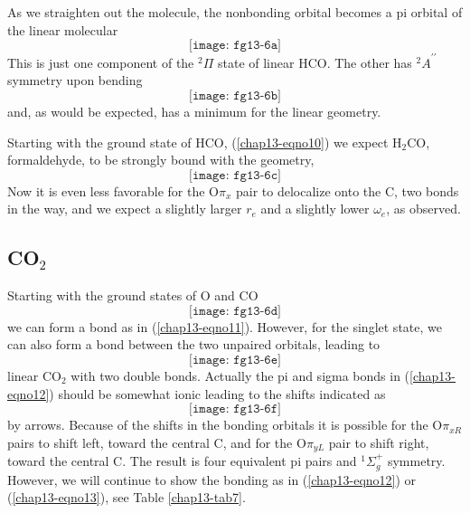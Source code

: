 As we straighten out the molecule, the nonbonding orbital becomes a pi 
orbital of the linear molecular
\begin{equation}
\texttt{[image: fg13-6a]}
\end{equation}
This is just one component of the ${^2\Pi}$ state of linear HCO.  The other 
has ${^2A}^{\prime \prime}$ symmetry upon bending
\begin{equation}
\texttt{[image: fg13-6b]}
\end{equation}
and, as would be expected, has a minimum for the linear geometry.

Starting with the ground state of HCO, (\ref{chap13-eqno10}) we expect
H$_2$CO, formaldehyde, to be strongly bound with the geometry,
\begin{equation}
\texttt{[image: fg13-6c]}
\end{equation}
Now it is even less favorable for the O$\pi_x$ pair to delocalize onto the C, 
two bonds in the way, and we expect a slightly larger $r_e$ and a slightly 
lower $\omega_e$, as observed.

\subsection{CO$_2$}


Starting with the ground states of O and CO
\begin{equation}
\texttt{[image: fg13-6d]}
\label{chap13-eqno11}
\end{equation}
we can form a bond as in (\ref{chap13-eqno11}).  However, for the
singlet state, we can also form a bond between the two unpaired
orbitals, leading to
\begin{equation}
\texttt{[image: fg13-6e]}
\label{chap13-eqno12}
\end{equation}
linear CO$_2$ with two double bonds.  Actually the pi and sigma bonds
in (\ref{chap13-eqno12}) should be somewhat ionic leading to the
shifts indicated as
\begin{equation}
\texttt{[image: fg13-6f]}
\label{chap13-eqno13}
\end{equation}
by arrows.  Because of the shifts in the bonding orbitals it is
possible for the O$\pi_{xR}$ pairs to shift left, toward the central
C, and for the O$\pi_{yL}$ pair to shift right, toward the central
C. The result is four equivalent pi pairs and ${^1\Sigma}^+_g$
symmetry.  However, we will continue to show the bonding as in
(\ref{chap13-eqno12}) or (\ref{chap13-eqno13}), see Table
\ref{chap13-tab7}.


